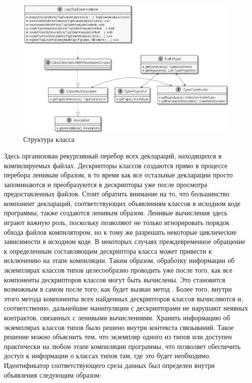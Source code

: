 \begin{figure}[htbp]
    \centering
    \includegraphics[width=\textwidth]{resources/06/12_class_descriptor.png}
    \caption{Структура класса }
    \label{fig:lazy-top-down-analyzer}
\end{figure}

Здесь организован рекурсивный перебор всех деклараций, находящихся в компилируемых файлах. Дескрипторы классов создаются прямо в процессе перебора ленивым образом, в то время как все остальные декларации просто запоминаются и преобразуются в дескрипторы уже после просмотра предоставленных файлов. Стоит обратить внимание на то, что большинство компонент деклараций, соответствующих объявлениям классов в исходном коде программы, также создаются ленивым образом. Ленивые вычисления здесь играют важную роль, поскольку позволяют не только игнорировать порядок обхода файлов компилятором, но к тому же разрешать некоторые циклические зависимости в исходном коде. В некоторых случаях преждевременное обращение к определенным составляющим дескриптора класса может привести к исключению на этапе компиляции. Таким образом, обработку информации об экземплярах классов типов целесообразно проводить уже после того, как все компоненты дескрипторов классов могут быть вычислены. Это становится возможным в самом  после того, как будет вызван метод . Более того, внутри этого метода компоненты всех найденных дескрипторов классов вычисляются и, соответственно, дальнейшие манипуляции с дескрипторами не нарушают неявных контрактов, связанных с ленивыми вычислениями. Хранить информацию об экземплярах классов типов было решено внутри контекста связываний. Такое решение можно объяснить тем, что экземпляр одного из типов  или  доступен практически на любом этапе компиляции программы, что позволяет обеспечить доступ к информации о классах типов там, где это будет необходимо. Идентификатор соответствующего среза данных был определен внутри объявления  следующим образом:

